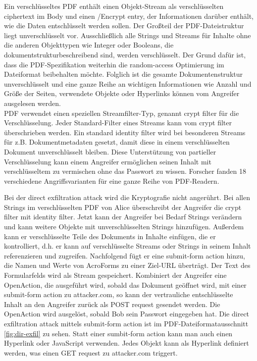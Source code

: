 Ein verschlüsseltes PDF enthält einen Objekt-Stream als verschlüsselten ciphertext im Body und einen /Encrypt entry, der Informationen darüber enthält, wie die Daten entschlüsselt werden sollen. Der Großteil der PDF-Dateistruktur liegt unverschlüsselt vor. Ausschließlich alle Strings und Streams für Inhalte ohne die anderen Objekttypen wie Integer oder Booleans, die dokumentstrukturbeschreibend sind, werden verschlüsselt. Der Grund dafür ist, dass die PDF-Spezifikation weiterhin die random-access Optimierung im Dateiformat beibehalten möchte. Folglich ist die gesamte Dokumentenstruktur unverschlüsselt und eine ganze Reihe an wichtigen Informationen wie Anzahl und Größe der Seiten, verwendete Objekte oder Hyperlinks können vom Angreifer ausgelesen werden. \\
PDF verwendet einen speziellen Streamfilter-Typ, genannt crypt filter für die Verschlüsselung. Jeder Standard-Filter eines Streams kann vom crypt filter überschrieben werden. Ein standard identity filter wird bei besonderen Streams für z.B. Dokumentmetadaten gesetzt, damit diese in einem verschlüsselten Dokument unverschlüsselt bleiben. Diese Unterstützung von partieller Verschlüsselung kann einem Angreifer ermöglichen seinen Inhalt mit verschlüsseltem zu vermischen ohne das Passwort zu wissen. Forscher fanden 18 verschiedene Angriffsvarianten für eine ganze Reihe von PDF-Readern. \cite{ccc-break-pdf}
\par
Bei der direct exfiltration attack wird die Kryptografie nicht angerührt. Bei allen Strings im verschlüsselten PDF von Alice überschreibt der Angreifer die crypt filter mit identity filter. Jetzt kann der Angreifer bei Bedarf Strings verändern und kann weitere Objekte mit unverschlüsselten Strings hinzufügen. Außerdem kann er verschlüsselte Teile des Dokuments in Inhalte einfügen, die er kontrolliert, d.h. er kann auf verschlüsselte Streams oder Strings in seinem Inhalt referenzieren und zugreifen. Nachfolgend fügt er eine submit-form action hinzu, die Namen und Werte von AcroForms zu einer Ziel-URL überträgt. Der Text des Formularfelds wird als Stream gespeichert. Kombiniert der Angreifer eine OpenAction, die ausgeführt wird, sobald das Dokument geöffnet wird, mit einer submit-form action zu attacker.com, so kann der vertrauliche entschlüsselte Inhalt an den Angreifer zurück als POST request gesendet werden. Die OpenAction wird ausgelöst, sobald Bob sein Passwort eingegeben hat. Die direct exfiltration attack mittels submit-form action ist im PDF-Dateiformatausschnitt \ref{fig:dir-exfil} zu sehen. Statt einer sumbit-form action kann man auch einen Hyperlink oder JavaScript verwenden. Jedes Objekt kann als Hyperlink definiert werden, was einen GET request zu attacker.com triggert. \cite{ccc-break-pdf, pdfex}
\par


